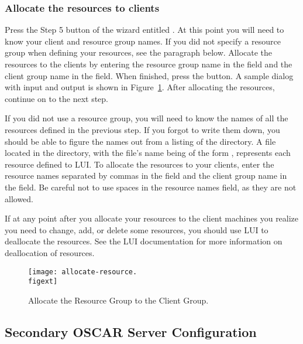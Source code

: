 \subsubsection{Allocate the resources to clients}

Press the Step 5 button of the wizard entitled . At this point you will need to know your client and
resource group names. If you did not specify a resource group when
defining your resources, see the paragraph below. Allocate the
resources to the clients by entering the resource group name in the
 field and the client group name in the
 field.  When finished, press the 
button. A sample dialog with input and output is shown in
Figure~\ref{fig:detailed-alloc-resource-to-client}. After allocating
the resources, continue on to the next step.
  
If you did not use a resource group, you will need to know the names
of all the resources defined in the previous step. If you forgot to
write them down, you should be able to figure the names out from a
listing of the  directory. A file located in the
directory, with the file's name being of the form
, represents each resource defined
to LUI. To allocate the resources to your clients, enter the resource
names separated by commas in the  field and the
client group name in the  field.  Be careful not
to use spaces in the resource names field, as they are not allowed.
  
If at any point after you allocate your resources to the client
machines you realize you need to change, add, or delete some
resources, you should use LUI to deallocate the resources. See the LUI
documentation for more information on deallocation of resources.
  
\begin{figure}[htbp]
  \begin{center}
    \texttt{[image: allocate-resource.\\figext]}
    \caption{Allocate the Resource Group to the Client Group.}
    \label{fig:detailed-alloc-resource-to-client}
  \end{center}
\end{figure}

\subsection{Secondary OSCAR Server Configuration}
\label{sec:detailed-secondary-oscar-server-config}

